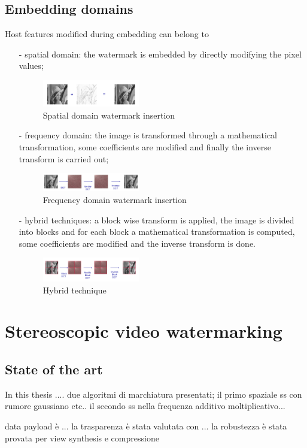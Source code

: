 \subsection{Embedding domains}
Host features modified during embedding can
belong to 
\begin{itemize}
\item[-] spatial domain: the watermark is embedded by directly modifying the pixel values;
\begin{figure}[h!]
\centering
\includegraphics[width=0.4\textwidth]{./img/domain1.png}
\caption{\small{Spatial domain watermark insertion}}
\label{fig:dom1}
\end{figure}
\item[-] frequency domain: the image is transformed through a mathematical transformation, some coefficients are modified and finally the inverse transform is carried out;
\begin{figure}[h!]
\centering
\includegraphics[width=0.4\textwidth]{./img/domain2.png}
\caption{\small{Frequency domain watermark insertion}}
\label{fig:dom2}
\end{figure}
\item[-] hybrid techniques: a block wise transform is applied, the image is divided
into blocks and for each block a mathematical transformation is computed, some coefficients are modified and the inverse transform is done.
\begin{figure}[h!]
\centering
\includegraphics[width=0.4\textwidth]{./img/domain3.png}
\caption{\small{Hybrid technique}}
\label{fig:dom3}
\end{figure}
\end{itemize}



\section{Stereoscopic video watermarking}

\subsection{State of the art}



\newpage
In this thesis ....
due algoritmi di marchiatura presentati; il primo spaziale ss con rumore gaussiano etc.. 
il secondo ss nella frequenza additivo moltiplicativo...


data payload è ...
la trasparenza è stata valutata con ...
la robustezza è stata provata per view synthesis e compressione




